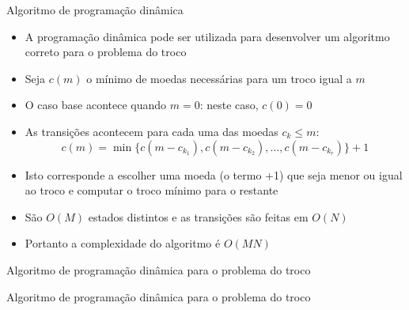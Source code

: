 \begin{frame}[fragile]{Algoritmo de programação dinâmica}

    \begin{itemize}
        \item A programação dinâmica pode ser utilizada para desenvolver um algoritmo correto para
            o problema do troco

        \item Seja $c(m)$ o mínimo de moedas necessárias para um troco igual a $m$

        \item O caso base acontece quando $m = 0$: neste caso, $c(0) = 0$

        \item As transições acontecem para cada uma das moedas $c_k \leq m$:
        \[
            c(m) = \min\{ c(m - c_{k_1}), c(m - c_{k_2}), \ldots, c(m - c_{k_r}) \} + 1
        \]

        \item Isto corresponde a escolher uma moeda (o termo +1) que seja menor ou igual ao troco e
            computar o troco mínimo para o restante

        \item São $O(M)$ estados distintos e as transições são feitas em $O(N)$

        \item Portanto a complexidade do algoritmo é $O(MN)$
    \end{itemize}

\end{frame}

\begin{frame}[fragile]{Algoritmo de programação dinâmica para o problema do troco}
\end{frame}

\begin{frame}[fragile]{Algoritmo de programação dinâmica para o problema do troco}
\end{frame}

